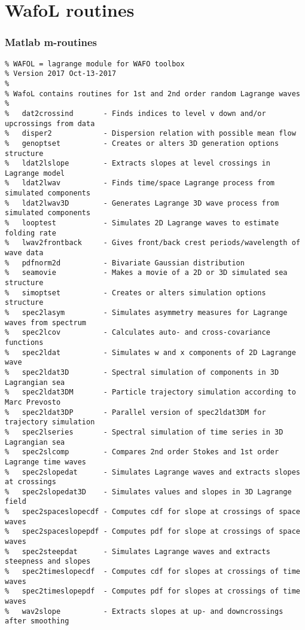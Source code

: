 \chapter{WafoL routines}

\subsection*{Matlab m-routines}
{\footnotesize\begin{verbatim}
% WAFOL = lagrange module for WAFO toolbox
% Version 2017 Oct-13-2017
%
% WafoL contains routines for 1st and 2nd order random Lagrange waves
%
%   dat2crossind       - Finds indices to level v down and/or upcrossings from data
%   disper2            - Dispersion relation with possible mean flow
%   genoptset          - Creates or alters 3D generation options structure
%   ldat2lslope        - Extracts slopes at level crossings in Lagrange model
%   ldat2lwav          - Finds time/space Lagrange process from simulated components
%   ldat2lwav3D        - Generates Lagrange 3D wave process from simulated components
%   looptest           - Simulates 2D Lagrange waves to estimate folding rate
%   lwav2frontback     - Gives front/back crest periods/wavelength of wave data
%   pdfnorm2d          - Bivariate Gaussian distribution  
%   seamovie           - Makes a movie of a 2D or 3D simulated sea structure 
%   simoptset          - Creates or alters simulation options structure
%   spec2lasym         - Simulates asymmetry measures for Lagrange waves from spectrum
%   spec2lcov          - Calculates auto- and cross-covariance functions 
%   spec2ldat          - Simulates w and x components of 2D Lagrange wave
%   spec2ldat3D        - Spectral simulation of components in 3D Lagrangian sea 
%   spec2ldat3DM       - Particle trajectory simulation according to Marc Prevosto
%   spec2ldat3DP       - Parallel version of spec2ldat3DM for trajectory simulation
%   spec2lseries       - Spectral simulation of time series in 3D Lagrangian sea 
%   spec2slcomp        - Compares 2nd order Stokes and 1st order Lagrange time waves 
%   spec2slopedat      - Simulates Lagrange waves and extracts slopes at crossings 
%   spec2slopedat3D    - Simulates values and slopes in 3D Lagrange field 
%   spec2spaceslopecdf - Computes cdf for slope at crossings of space waves 
%   spec2spaceslopepdf - Computes pdf for slope at crossings of space waves 
%   spec2steepdat      - Simulates Lagrange waves and extracts steepness and slopes
%   spec2timeslopecdf  - Computes cdf for slopes at crossings of time waves 
%   spec2timeslopepdf  - Computes pdf for slopes at crossings of time waves 
%   wav2slope          - Extracts slopes at up- and downcrossings after smoothing
\end{verbatim}

}

